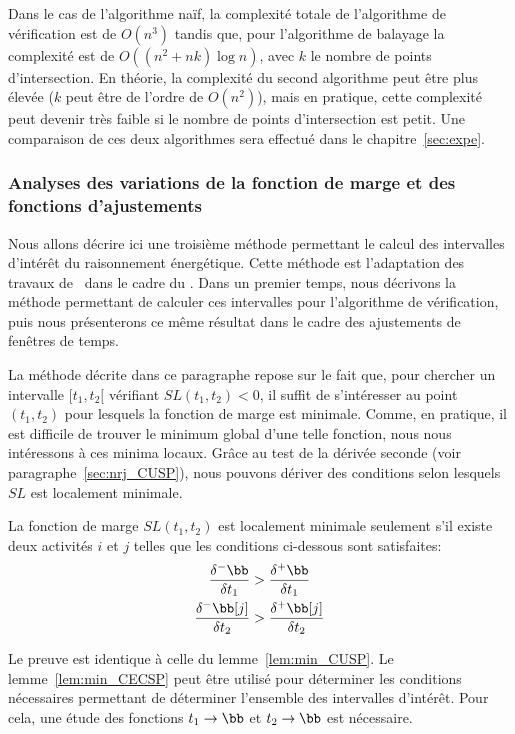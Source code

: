 Dans le cas de l'algorithme naïf, la complexité totale de l'algorithme
de vérification est de $O(n^3)$ tandis que, pour l'algorithme de
balayage la complexité est de $O((n^2+nk) \log n)$, avec $k$ le nombre
de points d'intersection. En théorie, la complexité du second
algorithme peut être plus élevée ($k$ peut être de l'ordre de
$O(n^2)$), mais en pratique, cette complexité peut devenir très faible
si le nombre de points d'intersection est petit. Une comparaison de
ces deux algorithmes sera effectué dans le chapitre~\ref{sec:expe}.

\subsubsection{Analyses des variations de la fonction de marge et des
  fonctions d'ajustements}

Nous allons décrire ici une troisième méthode permettant le calcul des
intervalles d'intérêt du raisonnement énergétique. Cette méthode est
l'adaptation des travaux de~\cite{DP} dans le cadre du \CUSP. Dans un
premier temps, nous décrivons la méthode permettant de calculer ces
intervalles pour l'algorithme de vérification, puis nous présenterons
ce même résultat dans le cadre des ajustements de fenêtres de temps. 

 La méthode décrite dans ce paragraphe repose sur le fait que, pour
 chercher un intervalle $[t_1,t_2[$ vérifiant $SL(t_1,t_2) < 0$, il
 suffit de s'intéresser au point $(t_1,t_2)$ pour lesquels la
 fonction de marge est minimale. Comme, en pratique, il est difficile
 de trouver le minimum global d'une telle fonction, nous nous
 intéressons à ces minima locaux. Grâce au test de la dérivée
 seconde (voir paragraphe~\ref{sec:nrj_CUSP}), nous pouvons dériver
 des conditions selon lesquels $SL$ est localement minimale.

\begin{lemma}[\cite{DP}]
\label{lem:min_CECSP}
La fonction de marge $SL(t_1,t_2)$ est localement minimale seulement
s'il existe deux activités $i$ et $j$ telles que les conditions
ci-dessous sont satisfaites: 
\begin{align} \frac{\delta^{-}\bb}{\delta t_1} &>
\frac{\delta^{+}\bb}{\delta t_1} \label{eq:deriv1_CECSP}\\ 
\frac{\delta^{-}\bb[j]}{\delta t_2}
& > \frac{\delta^{+}\bb[j]}{\delta t_2} \label{eq:deriv2_CECSP}
\end{align}
\end{lemma}

Le preuve est identique à celle du lemme~\ref{lem:min_CUSP}. Le
lemme~\ref{lem:min_CECSP} peut être utilisé pour déterminer les
conditions nécessaires permettant de déterminer l'ensemble des
intervalles d'intérêt. Pour cela, une étude des fonctions $t_1
\rightarrow \bb$ et $t_2 \rightarrow \bb$ est nécessaire. 


